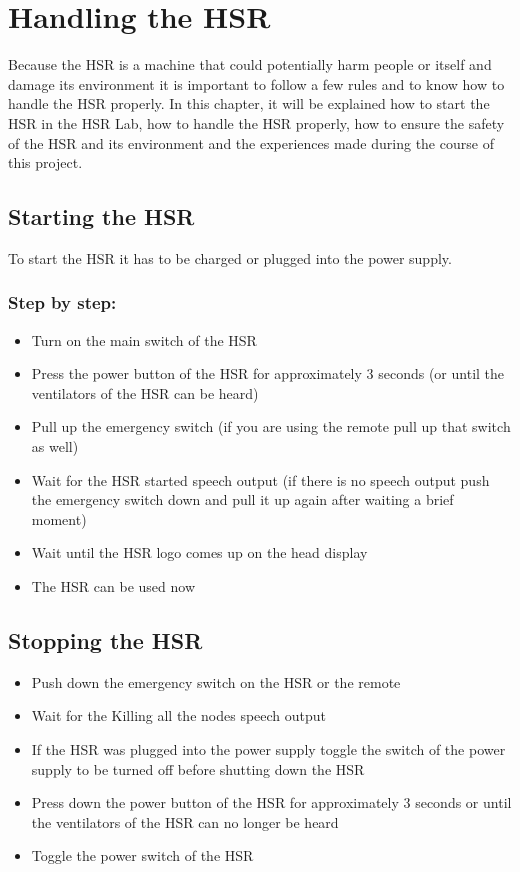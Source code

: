 \documentclass[main.tex]{subfiles}
\begin{document}
	\chapter{Handling the HSR}
	\label{workin_hsr}
	
	Because the HSR is a machine that could potentially harm people or itself and damage its environment it is important to follow a few rules and to know how to handle the HSR properly. In this chapter, it will be explained how to start the HSR in the HSR Lab, how to handle the HSR properly, how to ensure the safety of the HSR and its environment and the experiences made during the course of this project.

	\section{Starting the HSR}
	To start the HSR it has to be charged or plugged into the power supply.
	\subsection{Step by step:}
	\begin{itemize}
		\item Turn on the main switch of the HSR
		\item Press the power button of the HSR for approximately 3 seconds (or until the ventilators of the HSR can be heard)
		\item Pull up the emergency switch (if you are using the remote pull up that switch as well)
		\item Wait for the HSR started speech output (if there is no speech output push the emergency switch down and pull it up again after waiting a brief moment)
		\item Wait until the HSR logo comes up on the head display
		\item The HSR can be used now
	\end{itemize}
	\section{Stopping the HSR}
	\begin{itemize}
		\item Push down the emergency switch on the HSR or the remote
		\item Wait for the Killing all the nodes speech output
		\item If the HSR was plugged into the power supply toggle the switch of the power supply to be turned off before shutting down the HSR
		\item Press down the power button of the HSR for approximately 3 seconds or until the ventilators of the HSR can no longer be heard
		\item Toggle the power switch of the HSR
	\end{itemize}
\end{document}
